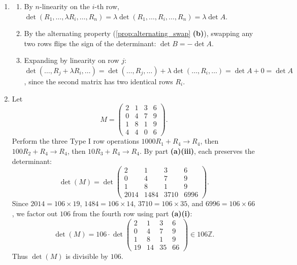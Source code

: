 \begin{exercisesolution}
\label{sol:row_operations_and_determinant_divisibility}
\begin{enumerate}[label=\textbf{(\alph*)}]
    \item \leavevmode
    \begin{enumerate}[label=\textbf{(\roman*)}]
        \item By $n$-linearity on the $i$-th row, $\det(R_1, \dots, \lambda R_i, \dots, R_n) = \lambda \det(R_1, \dots, R_i, \dots, R_n) = \lambda \det A$.
        \item By the alternating property (\cref{prop:alternating_swap} \textbf{(b)}), swapping any two rows flips the sign of the determinant: $\det B = -\det A$.
        \item Expanding by linearity on row $j$: $\det(\dots, R_j + \lambda R_i, \dots) = \det(\dots, R_j, \dots) + \lambda \det(\dots, R_i, \dots) = \det A + 0 = \det A$, since the second matrix has two identical rows $R_i$.
    \end{enumerate}

    \item Let
    \[
    M = \begin{pmatrix} 2 & 1 & 3 & 6 \\ 0 & 4 & 7 & 9 \\ 1 & 8 & 1 & 9 \\ 4 & 4 & 0 & 6 \end{pmatrix}.
    \]
    Perform the three Type I row operations $1000 R_1 + R_4 \to R_4$, then $100 R_2 + R_4 \to R_4$, then $10 R_3 + R_4 \to R_4$. By part \textbf{(a)(iii)}, each preserves the determinant:
    \[
    \det(M) = \det \begin{pmatrix}
      2 & 1 & 3 & 6 \\
      0 & 4 & 7 & 9 \\
      1 & 8 & 1 & 9 \\
      2014 & 1484 & 3710 & 6996
    \end{pmatrix}.
    \]
    Since $2014 = 106 \times 19$, $1484 = 106 \times 14$, $3710 = 106 \times 35$, and $6996 = 106 \times 66$, we factor out $106$ from the fourth row using part \textbf{(a)(i)}:
    \[
    \det(M) = 106 \cdot \det \begin{pmatrix}
      2 & 1 & 3 & 6 \\
      0 & 4 & 7 & 9 \\
      1 & 8 & 1 & 9 \\
      19 & 14 & 35 & 66
    \end{pmatrix} \in 106 \mathbb{Z}.
    \]
    Thus $\det(M)$ is divisible by $106$. \qedhere
\end{enumerate}
\end{exercisesolution}

